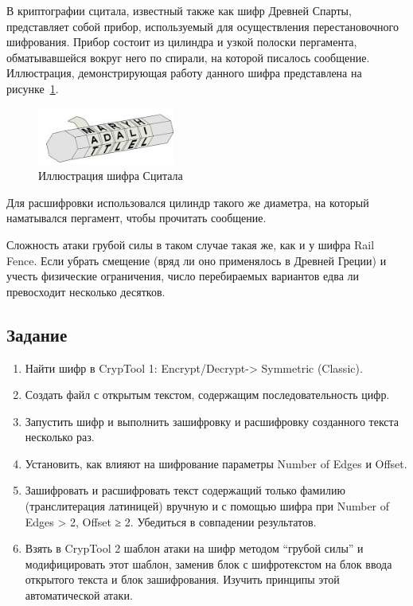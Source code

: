 \documentclass[a4paper, 14pt]{extarticle}
\begin{document}
В криптографии сцитала, известный также как шифр Древней Спарты, представляет собой прибор, используемый для осуществления перестановочного шифрования. Прибор состоит из цилиндра и узкой полоски пергамента, обматывавшейся вокруг него по спирали, на которой писалось сообщение. Иллюстрация, демонстрирующая работу данного шифра представлена на рисунке~\ref{img:theory:1}.

\begin{figure}[h]
    \centering
    \includegraphics[width=0.4\textwidth]{img/S004.jpg}
    \caption{Иллюстрация шифра Сцитала}%
    \label{img:theory:1}
\end{figure}

Для расшифровки использовался цилиндр такого же диаметра, на который наматывался пергамент, чтобы прочитать сообщение.

Сложность атаки грубой силы в таком случае такая же, как и у шифра Rail Fence. Если убрать смещение (вряд ли оно применялось в Древней Греции) и учесть физические ограничения, число перебираемых вариантов едва ли превосходит несколько десятков.

\subsection{Задание}
\begin{enumerate}
    \item Найти шифр в CrypTool 1: Encrypt/Decrypt-> Symmetric (Classic).
    \item Создать файл с открытым текстом, содержащим последовательность цифр.
    \item Запустить шифр и выполнить зашифровку и расшифровку созданного текста несколько раз. 
    \item Установить, как влияют на шифрование параметры Number of Edges и Offset.
    \item Зашифровать и расшифровать текст содержащий только фамилию (транслитерация латиницей) вручную и с помощью шифра при Number of Edges > 2, Offset ≥ 2. Убедиться в совпадении результатов. 
    \item Взять в CrypTool 2 шаблон атаки на шифр методом ``грубой силы'' и модифицировать этот шаблон, заменив блок с шифротекстом на блок ввода открытого текста и блок зашифрования. Изучить принципы этой автоматической атаки.
\end{enumerate}
\end{document}
